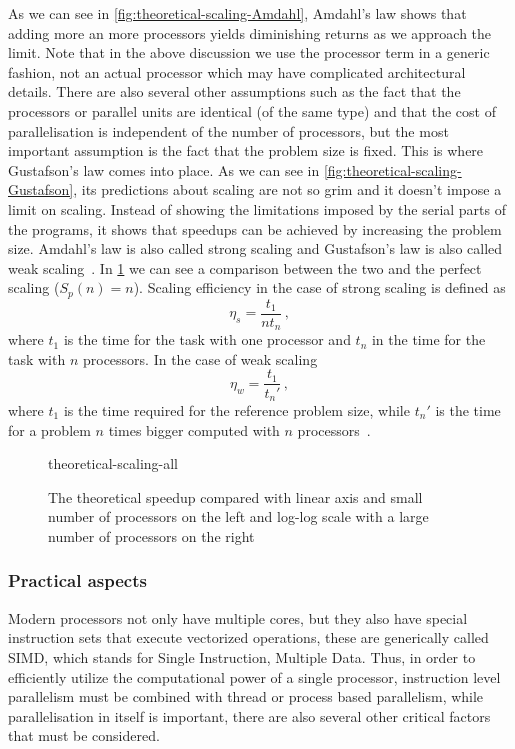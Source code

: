 \documentclass[12pt, class=report, crop=false]{standalone}
\begin{document}
As we can see in \cref{fig:theoretical-scaling-Amdahl}, Amdahl's law shows that
adding more an more processors yields diminishing returns as we approach the
limit. Note that in the above discussion we use the processor term in a generic
fashion, not an actual processor which may have complicated architectural details.
There are also several other assumptions such as the fact that the processors
or parallel units are identical (of the same type) and that the cost of parallelisation
is independent of the number of processors, but the most important assumption
is the fact that the problem size is fixed. This is where Gustafson's law
comes into place. As we can see in \cref{fig:theoretical-scaling-Gustafson},
its predictions about scaling are not so grim and it doesn't impose a limit on
scaling. Instead of showing the limitations imposed by the serial parts of the
programs, it shows that speedups can be achieved by increasing the problem size.
Amdahl's law is also called strong scaling and Gustafson's law is also called
weak scaling~\autocite{lin_scalabilitystrong_2018}.
In \cref{fig:theoretical-scaling} we can see a comparison
between the two and the perfect scaling (\(S_p(n)=n\)).
Scaling efficiency in the case of strong scaling is defined as
\[
\eta_s = \frac{t_1}{n t_n}\,,
\]
where \(t_1\) is the time for the task with one processor and
\(t_n\) in the time for the task with \(n\) processors.
In the case of weak scaling
\[
\eta_w = \frac{t_1}{t_n'}\,,
\]
where \(t_1\) is the time required for the reference problem size,
while \(t_n'\) is the time for a problem \(n\) times bigger computed with \(n\)
processors~\autocite{sharedhierarchicalacademicresearchcomputingnetwork_measuringparallel_2016}.

\begin{figure}[h]
  \centering
  {theoretical-scaling-all}%
  \caption{The theoretical speedup compared with linear axis and small number
  of processors on the left and log-log scale with a large number of processors
  on the right}\label{fig:theoretical-scaling}%
\end{figure}

\subsubsection{Practical aspects}

Modern processors not only have multiple cores, but they also have special instruction
sets that execute vectorized operations, these are generically called SIMD, which
stands for Single Instruction, Multiple Data. Thus, in order to efficiently utilize
the computational power of a single processor, instruction level parallelism must
be combined with thread or process based parallelism, while parallelisation in
itself is important, there are also several other critical factors that must be
considered.
\end{document}
